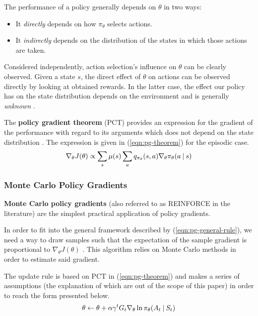 The performance of a policy generally depends on $\theta$ in two ways:
\begin{itemize}
    \item It \emph{directly} depends on how $\pi_{\theta}$ selects actions.
    \item It \emph{indirectly} depends on the distribution of the states in which those actions are taken.
\end{itemize}
Considered independently, action selection's influence on $\theta$ can be clearly observed.
Given a state $s$, the direct effect of $\theta$ on actions can be observed directly by looking at obtained rewards.
In the latter case, the effect our policy has on the state distribution depends on the environment and is generally \emph{unknown} \cite{rlai}.

The \textbf{policy gradient theorem} (PCT) provides an expression for the gradient of the performance with regard to its arguments which does not depend on the state distribution \cite{rlai}.
The expression is given in (\ref{eqn:pg-theorem}) for the episodic case.
\begin{equation} \label{eqn:pg-theorem}
    \nabla_{\theta} J(\theta) \propto
        \sum_{s}{
            \mu(s) \sum_{a}{
                q_{\pi_{\theta}}(s, a) \nabla_{\theta} \pi_{\theta}(a \:\vert\: s)
            }
        }
\end{equation}

\subsubsection{Monte Carlo Policy Gradients}
\textbf{Monte Carlo policy gradients} (also referred to as REINFORCE in the literature) are the simplest practical application of policy gradients.

In order to fit into the general framework described by (\ref{eqn:pg-general-rule}), we need a way to draw samples such that the expectation of the sample gradient is proportional to $\nabla_{\theta} J(\theta)$ \cite{rlai}.
This algorithm relies on Monte Carlo methods in order to estimate said gradient.

The update rule is based on PCT in (\ref{eqn:pg-theorem}) and makes a series of assumptions (the explanation of which are out of the scope of this paper) in order to reach the form presented below.
\begin{equation}
    \theta \leftarrow \theta + \alpha \gamma^{t} G_{t} \nabla_{\theta} \ln{\pi_{\theta}(A_{t} \:\vert\: S_{t})}
\end{equation}

